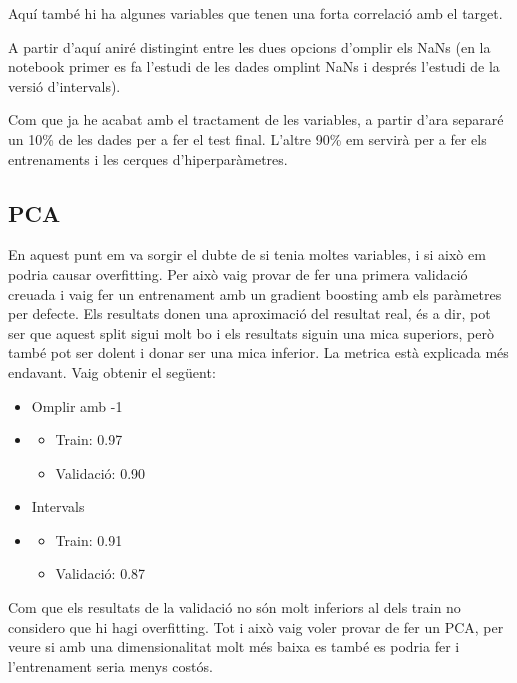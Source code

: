 \documentclass[9pt,a4paper,twoside]{tau-class/tau}
\begin{document}
    Aquí també hi ha algunes variables que tenen una forta correlació amb el target.

    A partir d'aquí aniré distingint entre les dues opcions d'omplir els NaNs (en la notebook primer es fa l'estudi de les dades omplint NaNs i després l'estudi de la versió d'intervals).

    Com que ja he acabat amb el tractament de les variables, a partir d'ara separaré un 10\% de les dades per a fer el test final. L'altre 90\% em servirà per a fer els entrenaments i les cerques d'hiperparàmetres.

    \subsection{PCA}
    En aquest punt em va sorgir el dubte de si tenia moltes variables, i si això em podria causar overfitting. Per això vaig provar de fer una primera validació creuada i vaig fer un entrenament amb un gradient boosting amb els paràmetres per defecte. Els resultats donen una aproximació del resultat real, és a dir, pot ser que aquest split sigui molt bo i els resultats siguin una mica superiors, però també pot ser dolent i donar ser una mica inferior.
    La metrica està explicada més endavant. Vaig obtenir el següent:
    \begin{itemize}
        \item Omplir amb -1
        \item \begin{itemize}
            \item Train: 0.97
            \item Validació: 0.90
        \end{itemize}
        \item Intervals
        \item \begin{itemize}
            \item Train: 0.91
            \item Validació: 0.87
        \end{itemize}
    \end{itemize}
    Com que els resultats de la validació no són molt inferiors al dels train no considero que hi hagi overfitting. Tot i això vaig voler provar de fer un PCA, per veure si amb una dimensionalitat molt més baixa es també es podria fer i l'entrenament seria menys costós.
\end{document}
